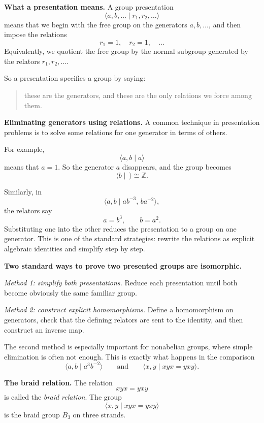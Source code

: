 \documentclass[12pt,a4paper]{article}
\theoremstyle{notespace}
\begin{document}
\textbf{What a presentation means.}
A group presentation
\[
\langle a,b,\dots \mid r_1,r_2,\dots\rangle
\]
means that we begin with the free group on the generators \(a,b,\dots\), and then impose the relations
\[
r_1=1,\quad r_2=1,\quad \dots
\]
Equivalently, we quotient the free group by the normal subgroup generated by the relators \(r_1,r_2,\dots\).

So a presentation specifies a group by saying:
\begin{quote}
	these are the generators, and these are the only relations we force among them.
\end{quote}

\medskip

\textbf{Eliminating generators using relations.}
A common technique in presentation problems is to solve some relations for one generator in terms of others.

For example,
\[
\langle a,b\mid a\rangle
\]
means that \(a=1\). So the generator \(a\) disappears, and the group becomes
\[
\langle b\mid\ \rangle\cong \mathbb Z.
\]

Similarly, in
\[
\langle a,b\mid ab^{-3},\,ba^{-2}\rangle,
\]
the relators say
\[
a=b^3,\qquad b=a^2.
\]
Substituting one into the other reduces the presentation to a group on one generator. This is one of the standard strategies: rewrite the relations as explicit algebraic identities and simplify step by step.

\medskip

\textbf{Two standard ways to prove two presented groups are isomorphic.}

\emph{Method 1: simplify both presentations.}
Reduce each presentation until both become obviously the same familiar group.

\emph{Method 2: construct explicit homomorphisms.}
Define a homomorphism on generators, check that the defining relators are sent to the identity, and then construct an inverse map.

The second method is especially important for nonabelian groups, where simple elimination is often not enough. This is exactly what happens in the comparison
\[
\langle a,b\mid a^3b^{-2}\rangle
\qquad\text{and}\qquad
\langle x,y\mid xyx=yxy\rangle.
\]

\medskip

\textbf{The braid relation.}
The relation
\[
xyx=yxy
\]
is called the \emph{braid relation}. The group
\[
\langle x,y\mid xyx=yxy\rangle
\]
is the braid group \(B_3\) on three strands.
\end{document}
